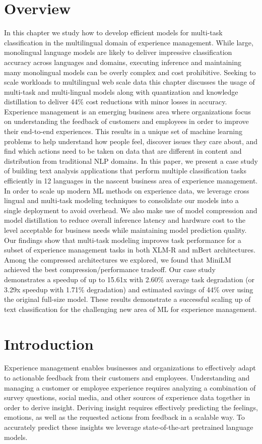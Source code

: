 \section{Overview}
In this chapter we study how to develop efficient models for multi-task classification in the multilingual domain of experience management. While large, monolingual language models are likely to deliver impressive classification accuracy across languages and domains, executing inference and maintaining many monolingual models can be overly complex and cost prohibitive. Seeking to scale workloads to multilingual web scale data this chapter discusses the usage of multi-task and multi-lingual models along with quantization and knowledge distillation to deliver 44\% cost reductions with minor losses in accuracy.\\
Experience management is an emerging business area where organizations focus on understanding the feedback of customers and employees in order to improve their end-to-end experiences.
This results in a unique set of machine learning problems to help understand how people feel, discover issues they care about, and find which actions need to be taken on data that are different in content and distribution from traditional NLP domains.
In this paper, we present a case study of building text analysis applications that perform multiple classification tasks efficiently in 12 languages in the nascent business area of experience management.
In order to scale up modern ML methods on experience data, we leverage cross lingual and multi-task modeling techniques to consolidate our models into a single deployment to avoid overhead.
We also make use of model compression and model distillation to reduce overall inference latency and hardware cost to the level acceptable for business needs while maintaining model prediction quality.
Our findings show that multi-task modeling improves task performance for a subset of experience management tasks in both XLM-R and mBert architectures.
Among the compressed architectures we explored, we found that MiniLM achieved the best compression/performance tradeoff.
Our case study demonstrates a speedup of up to 15.61x with 2.60\% average task degradation (or 3.29x speedup with 1.71\% degradation) and estimated savings of 44\% over using the original full-size model.
These results demonstrate a successful scaling up of text classification for the challenging new area of ML for experience management.
\section{Introduction}
Experience management enables businesses and organizations to effectively adapt to actionable feedback from their customers and employees.
Understanding and managing a customer or employee experience requires analyzing a combination of survey questions, social media, and other sources of experience data together in order to derive insight.
Deriving insight requires effectively predicting the feelings, emotions, as well as the requested actions from feedback in a scalable way.
To accurately predict these insights we leverage state-of-the-art pretrained language models.

